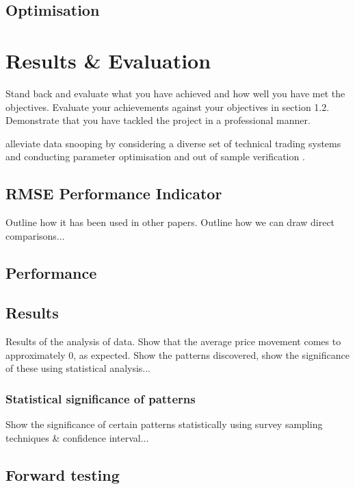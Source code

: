 \documentclass{article}
\theoremstyle{definition}
\begin{document}
\subsection{Optimisation}

\section{Results \& Evaluation}
Stand back and evaluate what you have achieved and how well you have met the objectives. Evaluate your achievements against your objectives in section 1.2. Demonstrate that you have tackled the project in a professional manner. 

alleviate data snooping by considering a diverse set of technical trading systems and conducting parameter optimisation and out of sample verification \citep{taprofitability}.

\subsection{RMSE Performance Indicator}

Outline how it has been used in other papers. Outline how we can draw direct comparisons...

\subsection{Performance}

\subsection{Results}

Results of the analysis of data. Show that the average price movement comes to approximately 0, as expected. Show the patterns discovered, show the significance of these using statistical analysis...

\subsubsection{Statistical significance of patterns}

Show the significance of certain patterns statistically using survey sampling techniques \& confidence interval...

\subsection{Forward testing}
\end{document}
